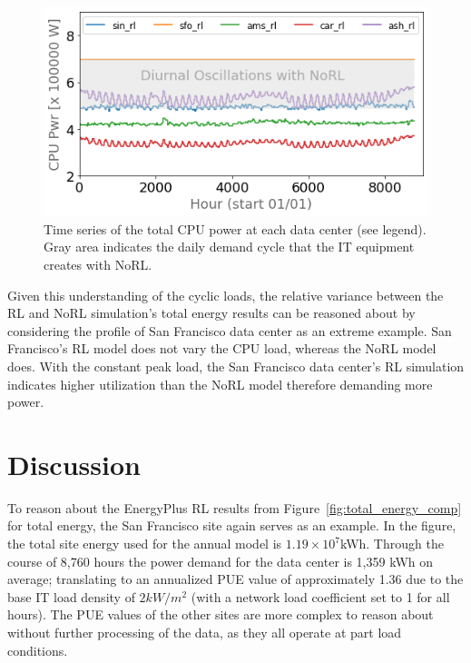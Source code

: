 \begin{figure}
  \centering
  \includegraphics[scale=0.45]{img/cpu_comps.png}
  \caption{Time series of the total CPU power at each data center (see legend). Gray area indicates the daily demand cycle that the IT equipment creates with NoRL.}
  \label{fig:cpu_comps}
  \end{figure}

  Given this understanding of the cyclic loads, the relative variance between the RL and NoRL simulation’s total energy results can be reasoned about by considering the profile of San Francisco data center as an extreme example. San Francisco’s RL model does not vary the CPU load, whereas the NoRL model does. With the constant peak load, the San Francisco data center’s RL simulation indicates higher utilization than the NoRL model therefore demanding more power.


\section{Discussion}
To reason about the EnergyPlus RL results from Figure~\ref{fig:total_energy_comp} for total energy, the San Francisco site again serves as an example. In the figure, the total site energy used for the annual model is $1.19 \times 10^7$kWh. Through the course of 8,760 hours the power demand for the data center is 1,359 kWh on average; translating to an annualized PUE value of approximately 1.36 due to the base IT load density of $2 kW/m^2$ (with a network load coefficient set to 1 for all hours). The PUE values of the other sites are more complex to reason about without further processing of the data, as they all operate at part load conditions.

